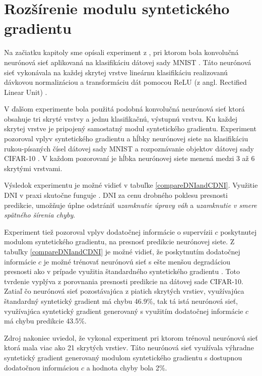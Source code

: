 \section{Rozšírenie modulu syntetického gradientu}

Na začiatku kapitoly sme opísali experiment z \cite{Jaderberg2016}, pri ktorom bola konvolučná neurónová sieť aplikovaná na klasifikáciu dátovej sady MNIST \cite{yann1998mnist}. Táto neurónová sieť vykonávala na každej skrytej vrstve lineárnu klasifikáciu realizovanú dávkovou normalizáciou \cite{Ioffe2015} a transformáciu dát pomocou ReLU (z angl. Rectified Linear Unit) \cite{Xu2015}. 

V ďalšom experimente \cite{Jaderberg2016} bola použitá podobná konvolučná neurónová sieť ktorá obsahuje tri skryté vrstvy a jednu klasifikačnú, výstupnú vrstvu. Ku každej skrytej vrstve je pripojený samostatný modul syntetického gradientu. Experiment pozoroval vplyv syntetického gradientu a hĺbky neurónovej siete na klasifikáciu rukou-písaných čísel dátovej sady MNIST a rozpoznávanie objektov dátovej sady CIFAR-10 \cite{Krizhevsky09learningmultiple}. V každom pozorovaní je hĺbka neurónovej siete menená medzi 3 až 6 skrytými vrstvami. 

Výsledok experimentu je možné vidieť v tabuľke \ref{compareDNIandCDNI}. Využitie DNI v praxi skutočne funguje \cite{Jaderberg2016}. DNI za cenu drobného poklesu presnosti predikcie, umožňuje úplne odstrániť \textit{uzamknutie úpravy váh} a \textit{uzamknutie v smere spätného šírenia chyby}. 

Experiment tiež pozoroval vplyv dodatočnej informácie o supervízii $c$ poskytnutej modulom syntetického gradientu, na presnosť predikcie neurónovej siete. Z tabuľky \ref{compareDNIandCDNI} je možné vidieť, že poskytnutím dodatočnej informácie $c$ je možné trénovať neurónovú sieť s ešte menšou degradáciou presnosti ako v prípade využitia štandardného syntetického gradientu \cite{Jaderberg2016}. Toto tvrdenie vyplýva z porovnania presnosti predikcie na dátovej sade CIFAR-10. Zatiaľ čo neurónová sieť pozostávajúca z piatich skrytých vrstiev, využívajúca štandardný syntetický gradient má chybu 46.9\%, tak tá istá neurónová sieť, využívajúca syntetický gradient generovaný s využitím dodatočnej informácie $c$ má chybu predikcie 43.5\%. 

Zdroj \cite{Jaderberg2016} nakoniec uviedol, že vykonal experiment pri ktorom trénoval neurónovú sieť ktorá mala viac ako 21 skrytých vrstiev. Táto neurónová sieť využívala výhradne syntetický gradient generovaný modulom syntetického gradientu s dostupnou dodatočnou informáciou $c$ a hodnota chyby bola 2\%.

